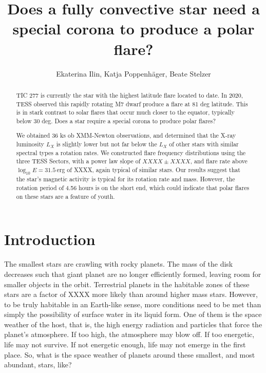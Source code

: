 \documentclass[twocolumn]{aastex631}
\begin{document}
\title{Does a fully convective star need a special corona to produce a polar flare?}

\author{Ekaterina Ilin, Katja Poppenh\"ager, Beate Stelzer}


\begin{abstract}
    TIC 277 is currently the star with the highest latitude flare located to date. In 2020, TESS observed this rapidly rotating M7 dwarf produce a flare at 81 deg latitude. This is in stark contrast to solar flares that occur much closer to the equator, typically below 30 deg. Does a star require a special corona to produce polar flares?

    We obtained 36 ks ob XMM-Newton observations, and determined that the X-ray luminosity $L_X$ is slightly lower but not far below the $L_X$ of other stars with similar spectral types a rotation rates. We constructed flare frequency distributions using the three TESS Sectors, with a power law slope of $XXXX\pm XXXX$, and flare rate above $\log_{10}E=31.5\,$erg of XXXX, again typical of similar stars. Our results suggest that the star's magnetic activity is typical for its rotation rate and mass. However, the rotation period of 4.56 hours is on the short end, which could indicate that polar flares on these stars are a feature of youth.  
    
\end{abstract}

\section{Introduction}
\label{sec:intro}
The smallest stars are crawling with rocky planets. The mass of the disk decreases such that giant planet are no longer efficiently formed, leaving room for smaller objects in the orbit. Terrestrial planets in the habitable zones of these stars are a factor of XXXX more likely than around higher mass stars. However, to be truly habitable in an Earth-like sense, more conditions need to be met than simply the possibility of surface water in its liquid form. One of them is the space weather of the host, that is, the high energy radiation and particles that force the planet's atmosphere. If too high, the atmosphere may blow off. If too energetic, life may not survive. If not energetic enough, life may not emerge in the first place. So, what is the space weather of planets around these smallest, and most abundant, stars, like? 
\end{document}
